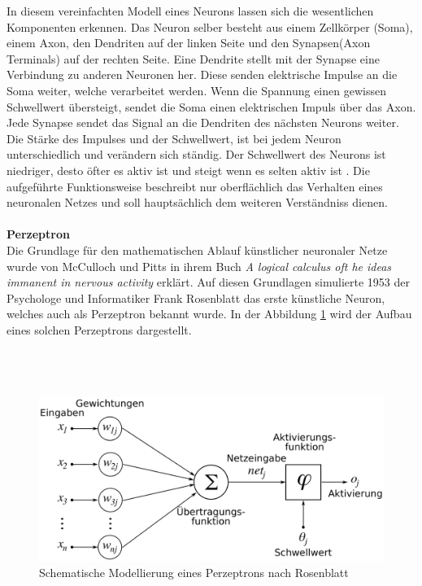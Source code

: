 \documentclass[a4paper,12pt,oneside]{article}
\begin{document}
In diesem vereinfachten Modell eines Neurons lassen sich die wesentlichen Komponenten erkennen. Das Neuron selber besteht aus einem Zellkörper (Soma), einem Axon, den Dendriten auf der linken Seite und den Synapsen(Axon Terminals) auf der rechten Seite. Eine Dendrite stellt mit der Synapse eine Verbindung zu anderen Neuronen her. Diese senden elektrische Impulse an die Soma weiter, welche verarbeitet werden. Wenn die Spannung einen gewissen Schwellwert übersteigt, sendet die Soma einen elektrischen Impuls über das Axon. Jede Synapse sendet das Signal an die Dendriten des nächsten Neurons weiter. Die Stärke des Impulses und der Schwellwert, ist bei jedem Neuron unterschiedlich und verändern sich ständig. Der Schwellwert des Neurons ist niedriger, desto öfter es aktiv ist und steigt wenn es selten aktiv ist \cite{schmidt2013physiologie}. Die aufgeführte Funktionsweise beschreibt nur oberflächlich das Verhalten eines neuronalen Netzes und soll hauptsächlich dem weiteren Verständniss dienen.\\\\
\textbf{Perzeptron}\\
Die Grundlage für den mathematischen Ablauf künstlicher neuronaler Netze wurde von McCulloch und Pitts in ihrem Buch \textit{A logical calculus oft he ideas immanent in nervous activity} erklärt. Auf diesen Grundlagen simulierte 1953 der Psychologe und Informatiker Frank Rosenblatt das erste künstliche Neuron, welches auch als Perzeptron bekannt wurde. In der Abbildung \ref{img:Perzeptron} wird der Aufbau eines solchen Perzeptrons dargestellt.\\\\\\\\
\begin{figure}
	[h]
	\centering
	\includegraphics[scale=0.3]{Sources/perzeptron2.png}
	\caption{Schematische Modellierung eines Perzeptrons nach Rosenblatt \cite{perzeptron2019}}
	\label{img:Perzeptron}
\end{figure}\\
\end{document}
